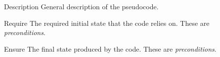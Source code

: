 \documentclass[a4paper, 11pt]{article}
\begin{document}
\begin{latexcode}
    \usepackage{algxpar}
\end{latexcode}
%
%
%
\begin{macro}{Description}
    General description of the pseudocode.
\end{macro}
\begin{macro}{Require}
    The required initial state that the code relies on. These are \textit{preconditions}.
\end{macro}
\begin{macro}{Ensure}
    The final state produced by the code. These are \textit{preconditions}.
\end{macro}
\end{document}
